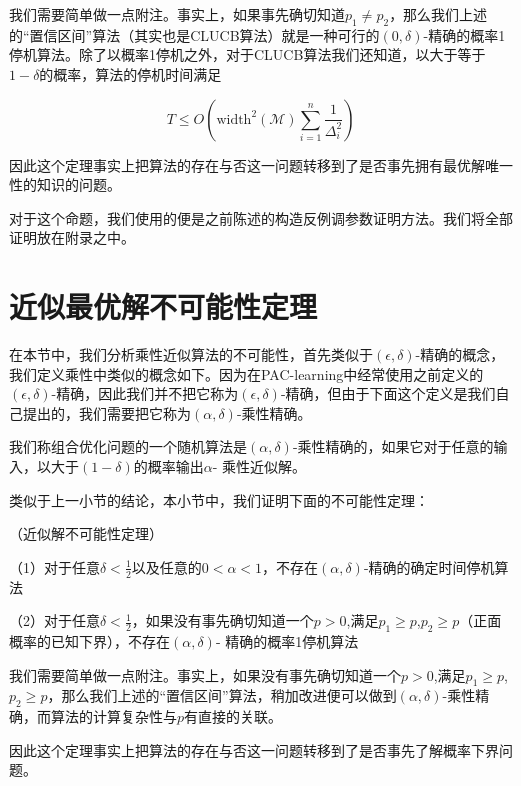 \documentclass[bachelor]{thuthesis}
\begin{document}
我们需要简单做一点附注。事实上，如果事先确切知道$p_1\ne p_2$，那么我们上述的“置信区间”算法（其实也是CLUCB算法）就是一种可行的$(0,\delta)$-精确的概率1停机算法。除了以概率1停机之外，对于CLUCB算法我们还知道，以大于等于$1-\delta$的概率，算法的停机时间满足

\[T\le O\left(\text{width}^2(\mathcal{M})\sum_{i=1}^{n}\frac{1}{\Delta_i^2}\right)\]

因此这个定理事实上把算法的存在与否这一问题转移到了是否事先拥有最优解唯一性的知识的问题。

对于这个命题，我们使用的便是之前陈述的构造反例调参数证明方法。我们将全部证明放在附录之中。

\section{近似最优解不可能性定理}


在本节中，我们分析乘性近似算法的不可能性，首先类似于$(\epsilon,\delta)$-精确的概念，我们定义乘性中类似的概念如下。因为在PAC-learning中经常使用之前定义的$(\epsilon,\delta)$-精确，因此我们并不把它称为$(\epsilon,\delta)$-精确，但由于下面这个定义是我们自己提出的，我们需要把它称为$(\alpha,\delta)$-乘性精确。

\begin{definition}

我们称组合优化问题的一个随机算法是$(\alpha,\delta)$-乘性精确的，如果它对于任意的输入，以大于$(1-\delta)$的概率输出$\alpha$- 乘性近似解。

\end{definition}


类似于上一小节的结论，本小节中，我们证明下面的不可能性定理：

\begin{theorem}（近似解不可能性定理）
\label{thm:impomul}

（1）对于任意$\delta<\frac{1}{2}$以及任意的$0<\alpha<1$，不存在$(\alpha,\delta)$-精确的确定时间停机算法

（2）对于任意$\delta<\frac{1}{2}$，如果没有事先确切知道一个$p>0$,满足$p_1\ge p$,$p_2\ge p$（正面概率的已知下界），不存在$(\alpha,\delta)$- 精确的概率1停机算法

\end{theorem}

我们需要简单做一点附注。事实上，如果没有事先确切知道一个$p>0$,满足$p_1\ge p$,$p_2\ge p$，那么我们上述的“置信区间”算法，稍加改进便可以做到$(\alpha,\delta)$-乘性精确，而算法的计算复杂性与$p$有直接的关联。

因此这个定理事实上把算法的存在与否这一问题转移到了是否事先了解概率下界问题。
\end{document}
